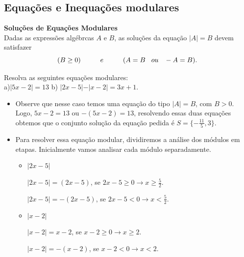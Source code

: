 \subsection{Equações e Inequações modulares}
\textbf{Soluções de Equações Modulares} \\
Dadas as expressões algébrcas $A$ e $B$, as soluções da equação $|A|=B$ devem satisfazer
$$(B \geq 0) \hspace{1cm} e \hspace{1cm} (A=B \hspace{0,3cm} ou \hspace{0,3cm} -A=B).$$
\begin{exe} Resolva as seguintes equações modulares: \\
a)$\vert 5x-2 \vert = 13$ \hspace{1cm} b) $\vert 2x-5 \vert - \vert x-2 \vert = 3x+1$. \\
\color{red}
\begin{itemize}
    \item[a)] Observe que nesse caso temos uma equação do tipo $|A|=B$, com $B>0$. Logo, $5x-2=13$ ou $-(5x-2)=13$, resolvendo essas duas equações obtemos que o conjunto solução da equação pedida é $S= \{-  \frac{11}{5},3 \}$. \\
    \item[b)] Para resolver essa equação modular, dividiremos a análise dos módulos em etapas. Inicialmente vamos analisar cada módulo separadamente.
    \begin{itemize}
        \item[I.] $|2x-5|$ \\
        \begin{minipage}[t]{.44\textwidth}
   $|2x-5|=(2x-5)$, se $2x-5 \geq 0 \to x \geq \frac{5}{2}$.
\end{minipage}
\begin{minipage}[t]{.44\textwidth}
 $|2x-5|=-(2x-5)$, se $2x-5 < 0 \to x < \frac{5}{2}$.
\end{minipage}
\item[II.] $|x-2|$ \\
 \begin{minipage}[t]{.44\textwidth}
   $|x-2|=x-2$, se $x-2 \geq 0 \to x \geq 2$.
\end{minipage}
\begin{minipage}[t]{.44\textwidth}
 $|x-2|=-(x-2)$, se $x-2 < 0 \to x < 2$.
\end{minipage} \\
\end{itemize}
\end{itemize}

\end{exe}
